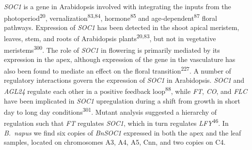 \documentclass[12pt,]{book}
\begin{document}
\emph{SOC1} is a gene in Arabidopsis involved with integrating the
inputs from the photoperiod\textsuperscript{20},
vernalization\textsuperscript{83,84}, hormone\textsuperscript{85} and
age-dependent\textsuperscript{87} floral pathways. Expression of
\emph{SOC1} has been detected in the shoot apical meristem, leaves,
stem, and roots of Arabidopsis plants\textsuperscript{20,83}, but not in
vegetative meristems\textsuperscript{300}. The role of \emph{SOC1} in
flowering is primarily mediated by its expression in the apex, although
expression of the gene in the vasculature has also been found to mediate
an effect on the floral transition\textsuperscript{227}. A number of
regulatory interactions govern the expression of \emph{SOC1} in
Arabidopsis. \emph{SOC1} and \emph{AGL24} regulate each other in a
positive feedback loop\textsuperscript{88}, while \emph{FT}, \emph{CO},
and \emph{FLC} have been implicated in \emph{SOC1} upregulation during a
shift from growth in short day to long day
conditions\textsuperscript{301}. Mutant analysis suggested a hierarchy
of regulation such that \emph{FT} regulates \emph{SOC1}, which in turn
regulates \emph{LFY}\textsuperscript{46}. In \emph{B.~napus} we find six
copies of \emph{BnSOC1} expressed in both the apex and the leaf samples,
located on chromosomes A3, A4, A5, Cnn, and two copies on C4.
\end{document}
